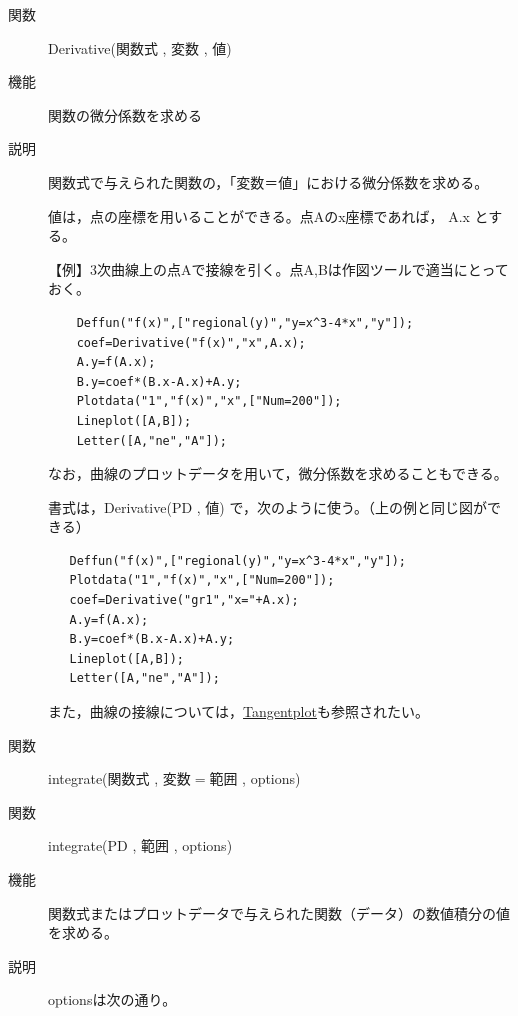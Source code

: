 \documentclass[papersize,a4paper,12pt,uplatex]{jsarticle}
\begin{document}
\begin{description}

\hypertarget{derivative}{}
\item[関数]  Derivative(関数式 , 変数 , 値)
\item[機能]  関数の微分係数を求める
\item[説明]  関数式で与えられた関数の，「変数＝値」における微分係数を求める。

値は，点の座標を用いることができる。点Aのx座標であれば， A.x とする。

\vspace{\baselineskip}
【例】3次曲線上の点Aで接線を引く。点A,Bは作図ツールで適当にとっておく。
\begin{verbatim}
    Deffun("f(x)",["regional(y)","y=x^3-4*x","y"]);
    coef=Derivative("f(x)","x",A.x);
    A.y=f(A.x);
    B.y=coef*(B.x-A.x)+A.y;
    Plotdata("1","f(x)","x",["Num=200"]);
    Lineplot([A,B]);
    Letter([A,"ne","A"]);
\end{verbatim}
    \begin{center}  \end{center}


なお，曲線のプロットデータを用いて，微分係数を求めることもできる。

書式は，Derivative(PD ,  値) で，次のように使う。（上の例と同じ図ができる）

\begin{verbatim}
   Deffun("f(x)",["regional(y)","y=x^3-4*x","y"]);
   Plotdata("1","f(x)","x",["Num=200"]);
   coef=Derivative("gr1","x="+A.x);
   A.y=f(A.x);
   B.y=coef*(B.x-A.x)+A.y;
   Lineplot([A,B]);
   Letter([A,"ne","A"]);
\end{verbatim}

また，曲線の接線については，\hyperlink{tangentplot}{Tangentplot}も参照されたい。


\vspace{\baselineskip}
\hypertarget{integrate}{}
\item[関数]  integrate(関数式 , 変数$=$範囲 , options)
\item[関数]  integrate(PD , 範囲 , options)
\item[機能]  関数式またはプロットデータで与えられた関数（データ）の数値積分の値を求める。
\item[説明]  optionsは次の通り。


\end{description}
\end{document}
